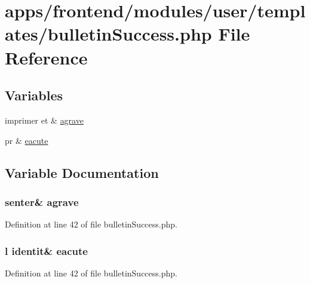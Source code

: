 \hypertarget{frontend_2modules_2user_2templates_2bulletin_success_8php}{\section{apps/frontend/modules/user/templates/bulletin\-Success.php File Reference}
\label{frontend_2modules_2user_2templates_2bulletin_success_8php}
}
\subsection*{Variables}
\begin{DoxyCompactItemize}
\item 
imprimer et \& \hyperlink{frontend_2modules_2user_2templates_2bulletin_success_8php_a0662d58eebb5df647b253a51d7d6fc13}{agrave}
\item 
pr \& \hyperlink{frontend_2modules_2user_2templates_2bulletin_success_8php_a20f2fa4a4bb1e8f7975b3600b2c21413}{eacute}
\end{DoxyCompactItemize}


\subsection{Variable Documentation}
\hypertarget{frontend_2modules_2user_2templates_2bulletin_success_8php_a0662d58eebb5df647b253a51d7d6fc13}{
\subsubsection[{agrave}]{\setlength{\rightskip}{0pt plus 5cm}senter\& agrave}}\label{frontend_2modules_2user_2templates_2bulletin_success_8php_a0662d58eebb5df647b253a51d7d6fc13}


Definition at line 42 of file bulletin\-Success.\-php.

\hypertarget{frontend_2modules_2user_2templates_2bulletin_success_8php_a20f2fa4a4bb1e8f7975b3600b2c21413}{
\subsubsection[{eacute}]{\setlength{\rightskip}{0pt plus 5cm}l identit\& eacute}}\label{frontend_2modules_2user_2templates_2bulletin_success_8php_a20f2fa4a4bb1e8f7975b3600b2c21413}


Definition at line 42 of file bulletin\-Success.\-php.

